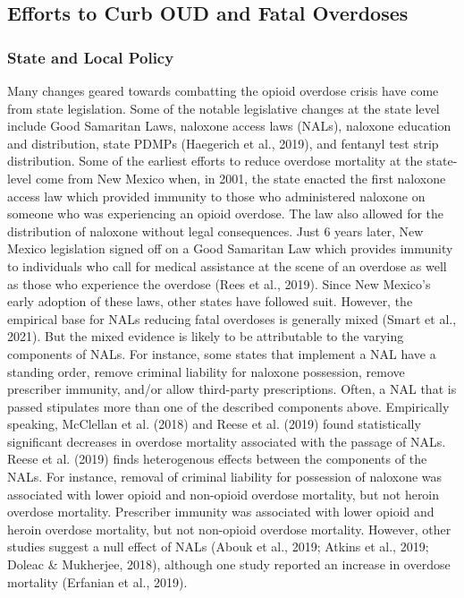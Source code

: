 \subsection{Efforts to Curb OUD and Fatal Overdoses}
\subsubsection{State and Local Policy}

Many changes geared towards combatting the opioid overdose crisis have come from state legislation. Some of the notable legislative changes at the state level include Good Samaritan Laws, naloxone access laws (NALs), naloxone education and distribution, state PDMPs (Haegerich et al., 2019), and fentanyl test strip distribution. Some of the earliest efforts to reduce overdose mortality at the state-level come from New Mexico when, in 2001, the state enacted the first naloxone access law which provided immunity to those who administered naloxone on someone who was experiencing an opioid overdose. The law also allowed for the distribution of naloxone without legal consequences. Just 6 years later, New Mexico legislation signed off on a Good Samaritan Law which provides immunity to individuals who call for medical assistance at the scene of an overdose as well as those who experience the overdose (Rees et al., 2019). Since New Mexico’s early adoption of these laws, other states have followed suit. However, the empirical base for NALs reducing fatal overdoses is generally mixed (Smart et al., 2021). But the mixed evidence is likely to be attributable to the varying components of NALs. For instance, some states that implement a NAL have a standing order, remove criminal liability for naloxone possession, remove prescriber immunity, and/or allow third-party prescriptions. Often, a NAL that is passed stipulates more than one of the described components above. Empirically speaking, McClellan et al. (2018) and Reese et al. (2019) found statistically significant decreases in overdose mortality associated with the passage of NALs. Reese et al. (2019) finds heterogenous effects between the components of the NALs. For instance, removal of criminal liability for possession of naloxone was associated with lower opioid and non-opioid overdose mortality, but not heroin overdose mortality. Prescriber immunity was associated with lower opioid and heroin overdose mortality, but not non-opioid overdose mortality. However, other studies suggest a null effect of NALs (Abouk et al., 2019; Atkins et al., 2019; Doleac & Mukherjee, 2018), although one study reported an increase in overdose mortality (Erfanian et al., 2019). 

